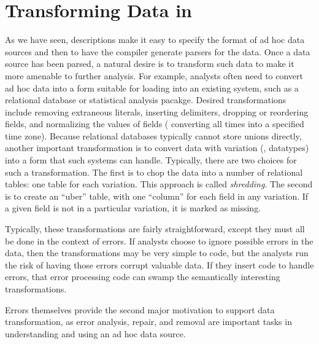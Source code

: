 \section{Transforming Data in \datatypebig{} }
\label{sec:data-transformation}

As we have seen, \datatype{} descriptions make it easy to specify the format of ad hoc data sources and then to have the \datatype{} compiler generate parsers for the data.
Once a data source has been parsed, a natural
desire is to transform such data to make it more amenable to further
analysis.  For example, analysts often need to convert ad hoc data
into a form suitable for loading into an existing system, such as a
relational database or statistical analysis pacakge.  Desired
transformations include removing extraneous literals, inserting
delimiters, dropping or reordering fields, and normalizing the values
of fields (\eg{} converting all times into a specified time zone).
Because relational databases typically cannot store unions directly,
another important transformation is to convert data with variation
(\ie{}, datatypes) into a form that such systems can handle.  Typically,
there are two choices for such a transformation.  The first is to chop
the data into a number of relational tables: one table for each
variation.  This approach is called \textit{shredding}. The second is
to create an ``uber'' table, with one ``column'' for each field in any
variation.  If a given field is not in a particular variation, it is
marked as missing.

Typically, these transformations are fairly straightforward, except
they must all be done in the context of errors.  If analysts choose to
ignore possible errors in the data, then the transformations may be
very simple to code, but the analysts run the risk of having those
errors corrupt valuable data.  If they insert code to handle errors,
that error processing code can swamp the semantically interesting
transformations. 

Errors themselves provide the second major motivation to support data transformation, as error analysis, repair, and removal are important tasks in understanding and using an ad hoc data source.

